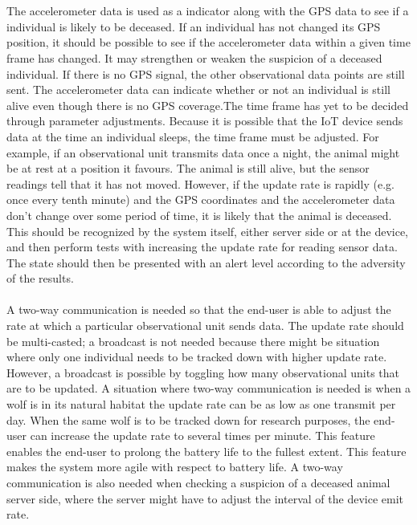 		\\\\
		The accelerometer data is used as a indicator along with the GPS data to see if a individual is likely to be deceased. If an individual has not changed its GPS position, it should be possible to see if the accelerometer data within a given time frame has changed. It may strengthen or weaken the suspicion of a deceased individual. If there is no GPS signal, the other observational data points are still sent. The accelerometer data can indicate whether or not an individual is still alive even though there is no GPS coverage.The time frame has yet to be decided through parameter adjustments. Because it is possible that the IoT device sends data at the time an individual sleeps, the time frame must be adjusted. For example, if an observational unit transmits data once a night, the animal might be at rest at a 
		position it favours. The animal is still alive, but the sensor readings tell that it has not moved. However, if the update rate is rapidly (e.g. once every tenth minute) and the GPS coordinates and the accelerometer data don’t change over some period of time, it is likely that the animal is deceased. This should be recognized by the system itself, either server side or at the device, and then perform tests with increasing the update rate for reading sensor data. The state should then be presented with an alert level according to the adversity of the results.
		\\\\
		A two-way communication is needed so that the end-user is able to adjust the rate at which a particular observational unit sends data. The update rate should be multi-casted; a broadcast is not needed because there might be situation where only one individual needs to be tracked down with higher update rate. However, a broadcast is possible by toggling how many observational units that are to be updated. A situation where two-way communication is needed is  when a wolf is in its natural habitat the update rate can be as low as one transmit per day. When the same wolf is to be tracked down for research purposes, the end-user can increase the update rate to several times per minute. This feature enables the end-user to prolong the battery life to the fullest extent. This feature makes the system more agile with respect to battery life. A two-way communication is also needed when checking a suspicion of a deceased animal server side, where the server might have to adjust the interval of the device emit rate. 

